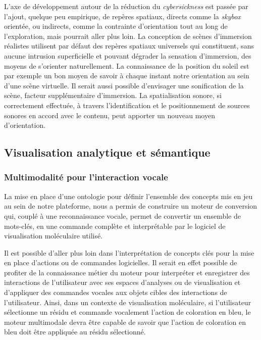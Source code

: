 L'axe de développement autour de la réduction du \textit{cybersickness} est passée par l'ajout, quelque peu empirique, de repères spatiaux, directs comme la \textit{skybox} orientée, ou indirects, comme la contrainte d'orientation tout au long de l'exploration, mais pourrait aller plus loin. La conception de scènes d'immersion réalistes utilisent par défaut des repères spatiaux universels qui constituent, sans aucune intrusion superficielle et pouvant dégrader la sensation d'immersion, des moyens de s'orienter naturellement. La connaissance de la position du soleil est par exemple un bon moyen de savoir à chaque instant notre orientation au sein d'une scène virtuelle.
Il serait aussi possible d'envisager une sonification de la scène, facteur supplémentaire d'immersion. La spatialisation sonore, si correctement effectuée, à travers l'identification et le positionnement de sources sonores en accord avec le contenu, peut apporter un nouveau moyen d'orientation.
 

\subsection*{Visualisation analytique et sémantique}

\subsubsection*{Multimodalité pour l'interaction vocale}

La mise en place d'une ontologie pour définir l'ensemble des concepts mis en jeu au sein de notre plateforme, nous a permis de construire un moteur de conversion qui, couplé à une reconnaissance vocale, permet de convertir un ensemble de mots-clés, en une commande complète et interprétable par le logiciel de visualisation moléculaire utilisé. 

Il est possible d'aller plus loin dans l'interprétation de concepts clés pour la mise en place d'actions ou de commandes logicielles. Il serait en effet possible de profiter de la connaissance métier du moteur pour interpréter et enregistrer des interactions de l'utilisateur avec ses espaces d'analyses ou de visualisation et d'appliquer des commandes vocales aux objets cibles des interactions de l'utilisateur. Ainsi, dans un contexte de visualisation moléculaire, si l'utilisateur sélectionne un résidu et commande vocalement l'action de coloration en bleu, le moteur multimodale devra être capable de savoir que l'action de coloration en bleu doit être appliquée au résidu sélectionné. 

